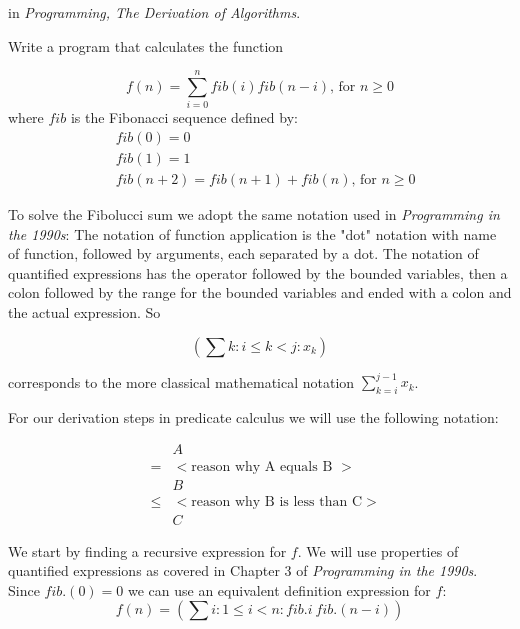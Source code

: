  in \textit{Programming, The Derivation of Algorithms}\cite{Kaldewaij90}.

\vspace{10 mm}
\begin{problem}
Write a program that calculates the function 

\begin{equation*}
f(n) = \sum_{i = 0}^{n} \mathit{fib}(i) \mathit{fib}(n - i)  \text{, for } n \geq 0
\end{equation*}
where $\mathit{fib}$ is the Fibonacci sequence defined by:
\begin{equation*}
\begin{split}
& \mathit{fib}(0) = 0 \\
& \mathit{fib}(1) = 1 \\
& \mathit{fib}(n + 2) = \mathit{fib}(n + 1) + \mathit{fib}(n) \text{, for } n \geq 0
\end{split}   
\end{equation*}

\end{problem}

To solve the Fibolucci sum we adopt the same notation used in \textit{Programming in the 1990s}\cite{Cohen90}: The notation of function application is the "dot" notation with name of function, followed by arguments, each separated by a dot. The notation of quantified expressions has the operator followed by the bounded variables, then a colon followed by the range for the bounded variables and ended with a colon and the actual expression. So

\[	 
	(\sum k : i \leq k < j : x_k)
\]

\noindent corresponds to the more classical mathematical notation $\sum_{k = i}^{ j - 1}x_k$. 

For our derivation steps in predicate calculus we will use the following notation:

\[
\begin{array}{lcl}
		&&A \\
	      &=& { < \mbox{reason why A equals B } >} \\      
                  &&B \\
                &\leq& { < \mbox{reason why B is less than C} >} \\
                  && C  
   \end{array}
\]

We start by finding a recursive expression for $f$. We will use properties of quantified expressions as covered in Chapter 3 of \textit{Programming in the 1990s}\cite{Cohen90}. Since $ \mathit{fib}.(0) = 0$ we can use an equivalent definition expression for $f$:
\[
f(n) = (\sum i: 1 \leq i < n: \mathit{fib}.i\  \mathit{fib}.(n - i))
\]

